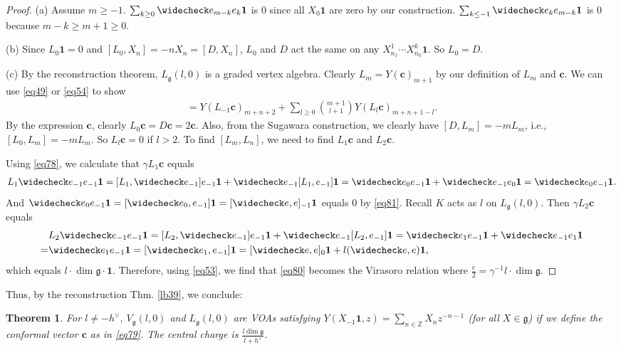 \documentclass[12pt,a4paper,notitlepage]{article}
\theoremstyle{definition}
\theoremstyle{plain}
\newtheorem{thm}[df]{Theorem}
\newcommand{\wch}{\widecheck}
\newcommand{\id}{\mathbf{1}}
\newcommand{\gk}{\mathfrak g}
\newcommand{\Zbb}{\mathbb Z}
\newcommand{\cbf}{\mathbf c}
\numberwithin{equation}{section}
\begin{document}
\begin{proof}
(a) Assume $m\geq-1$.  $\sum_{k\geq0}\wch e_{m-k}e_k\id$ is $0$ since all $X_0\id$ are zero by our construction. 	$\sum_{k\leq-1}\wch e_k e_{m-k}\id$ is $0$ because $m-k\geq m+1\geq0$.

(b) Since $L_0\id=0$ and $[L_0,X_n]=-nX_n=[D,X_n]$,  $L_0$ and $D$ act the same on any $X^1_{n_1}\cdots X^k_{n_k}\id$. So $L_0=D$.

(c) By the reconstruction theorem, $L_\gk(l,0)$ is a graded vertex algebra. Clearly $L_m=Y(\cbf)_{m+1}$ by our definition of $L_m$ and $\cbf$. We can use \eqref{eq49} or \eqref{eq54} to show
\begin{align}
[L_m,L_n]=Y(L_{-1}\cbf)_{m+n+2}+\sum_{l\geq 0}{m+1\choose l+1}Y(L_l\cbf)_{m+n+1-l}. \label{eq80}
\end{align}
By the expression $\cbf$, clearly $L_0\cbf=D\cbf=2\cbf$. Also, from the Sugawara construction, we clearly have $[D,L_m]=-mL_m$, i.e., $[L_0,L_m]=-mL_m$. So $L_l\cbf=0$ if $l>2$. To find $[L_m,L_n]$, we need to find $L_1\cbf$ and $L_2\cbf$.

Using \eqref{eq78}, we calculate that $\gamma L_1\cbf$ equals
\begin{align*}
L_1\wch e_{-1}e_{-1}\id=[L_1,\wch e_{-1}]e_{-1}\id+\wch e_{-1}[L_1,e_{-1}]\id=\wch e_0e_{-1}\id+\wch e_{-1}e_0\id=\wch e_0 e_{-1}\id.	
\end{align*}
And $\wch e_0e_{-1}\id=[\wch e_0,e_{-1}]\id=[\wch e,e]_{-1}\id$ equals $0$ by \eqref{eq81}. Recall $K$ acts as $l$ on $L_\gk(l,0)$. Then $\gamma L_2\cbf$ equals
\begin{align*}
&L_2\wch e_{-1}e_{-1}\id=[L_2,\wch e_{-1}]e_{-1}\id+\wch e_{-1}[L_2,e_{-1}]\id=\wch e_1e_{-1}\id+\wch e_{-1}e_1\id\\
=&	\wch e_1e_{-1}\id=[\wch e_1,e_{-1}]\id=[\wch e,e]_0\id+l(\wch e,e)\id,
\end{align*}
which equals $l\cdot \dim \gk\cdot \id$. Therefore, using \eqref{eq53}, we find that \eqref{eq80} becomes the Virasoro relation where $\frac c{2}=\gamma^{-1}l\cdot\dim\gk$.
\end{proof}

Thus, by the reconstruction Thm. \ref{lb39}, we conclude:

\begin{thm}
For $l\neq -h^\vee$, $V_\gk(l,0)$ and $L_\gk(l,0)$ are VOAs satisfying $Y(X_{-1}\id,z)=\sum_{n\in\Zbb}X_nz^{-n-1}$ (for all $X\in\gk$) if we define the conformal vector $\cbf$ as in \eqref{eq79}. The central charge is $\frac{l\dim\gk}{l+h^\vee}$.
\end{thm}	
\end{document}
